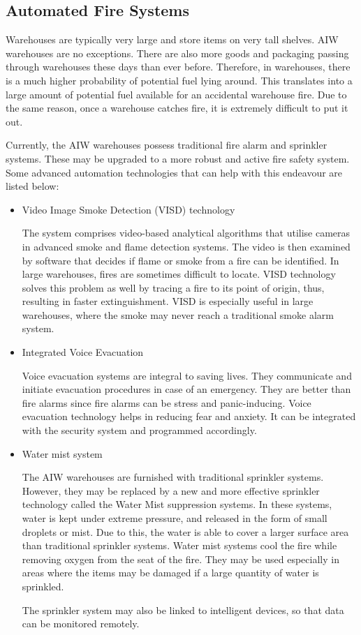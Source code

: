 \documentclass{report}
\begin{document}
\subsection{Automated Fire Systems}

Warehouses are typically very large and store items on very tall shelves. AIW warehouses are no exceptions. There are also more goods and packaging passing through warehouses these days than ever before. Therefore, in warehouses, there is a much higher probability of potential fuel lying around. This translates into a large amount of potential fuel available for an accidental warehouse fire. Due to the same reason, once a warehouse catches fire, it is extremely difficult to put it out.

Currently, the AIW warehouses possess traditional fire alarm and sprinkler systems. These may be upgraded to a more robust and active fire safety system. Some advanced automation technologies that can help with this endeavour are listed below:

\begin{itemize}
    

\item{Video Image Smoke Detection (VISD) technology

The system comprises video-based analytical algorithms that utilise cameras in advanced smoke and flame detection systems. The video is then examined by software that decides if flame or smoke from a fire can be identified. In large warehouses, fires are sometimes difficult to locate. VISD technology solves this problem as well by tracing a fire to its point of origin, thus, resulting in faster extinguishment. VISD is especially useful in large warehouses, where the smoke may never reach a traditional smoke alarm system.}


\item{Integrated Voice Evacuation

Voice evacuation systems are integral to saving lives. They communicate and initiate evacuation procedures in case of an emergency. They are better than fire alarms since fire alarms can be stress and panic-inducing. Voice evacuation technology helps in reducing fear and anxiety. It can be integrated with the security system and programmed accordingly.}

\item{Water mist system

The AIW warehouses are furnished with traditional sprinkler systems. However, they may be replaced by a new and more effective sprinkler technology called the Water Mist suppression systems. In these systems, water is kept under extreme pressure, and released in the form of small droplets or mist. Due to this, the water is able to cover a larger surface area than traditional sprinkler systems. Water mist systems cool the fire while removing oxygen from the seat of the fire. They may be used especially in areas where the items may be damaged if a large quantity of water is sprinkled.

The sprinkler system may also be linked to intelligent devices, so that data can be monitored remotely.}
\end{itemize}
\end{document}
